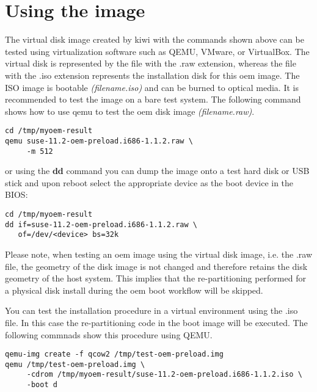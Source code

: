\section{Using the image}

The virtual disk image created by kiwi with the commands shown above can be 
tested using virtualization software such as QEMU, VMware, or VirtualBox. 
The virtual disk is represented by the file with the .raw extension, whereas 
the file with the .iso extension represents the installation disk for this oem
image. The ISO image is bootable \textit{(filename.iso)} and can be burned to 
optical media. It is recommended to test the image on a bare test system. The 
following command shows how to use qemu to test the oem disk image 
\textit{(filename.raw)}.

\begin{Command}{12cm}
\begin{verbatim}
cd /tmp/myoem-result
qemu suse-11.2-oem-preload.i686-1.1.2.raw \
     -m 512
\end{verbatim}
\end{Command}

or using the \textbf{dd} command you can dump the image onto a test hard 
disk or USB stick and upon reboot select the appropriate device as the 
boot device in the BIOS:

\begin{Command}{12cm}
\begin{verbatim}
cd /tmp/myoem-result
dd if=suse-11.2-oem-preload.i686-1.1.2.raw \
   of=/dev/<device> bs=32k
\end{verbatim}
\end{Command}

Please note, when testing an oem image using the virtual disk image, i.e. 
the .raw file, the geometry of the disk image is not changed and therefore 
retains the disk geometry of the host system. This implies that the 
re-partitioning performed for a physical disk install during the oem boot 
workflow will be skipped.

You can test the installation procedure in a virtual environment using
the .iso file. In this case the re-partitioning code in the boot image will
be executed. The following commnads show this procedure using QEMU.

\begin{Command}{12cm}
\begin{verbatim}
qemu-img create -f qcow2 /tmp/test-oem-preload.img
qemu /tmp/test-oem-preload.img \
     -cdrom /tmp/myoem-result/suse-11.2-oem-preload.i686-1.1.2.iso \
     -boot d
\end{verbatim}
\end{Command}

